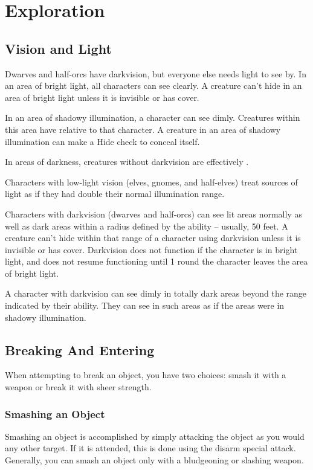 \section{Exploration}
\subsection{Vision and Light}
Dwarves and half-orcs have darkvision, but everyone else needs light to see by.  In an area of bright light, all characters can see clearly. A creature can't hide in an area of bright light unless it is invisible or has cover.

In an area of shadowy illumination, a character can see dimly. Creatures within this area have \concealment relative to that character. A creature in an area of shadowy illumination can make a Hide check to conceal itself.

In areas of darkness, creatures without darkvision are effectively \blinded.

Characters with low-light vision (elves, gnomes, and half-elves) treat sources of light as if they had double their normal illumination range.

Characters with darkvision (dwarves and half-orcs) can see lit areas normally as well as dark areas within a radius defined by the ability -- usually, 50 feet. A creature can't hide within that range of a character using darkvision unless it is invisible or has cover. Darkvision does not function if the character is in bright light, and does not resume functioning until 1 round the character leaves the area of bright light.

A character with darkvision can see dimly in totally dark areas beyond the range indicated by their ability. They can see in such areas as if the areas were in shadowy illumination.

\subsection{Breaking And Entering}
When attempting to break an object, you have two choices: smash it with a weapon or break it with sheer strength.

\subsubsection{Smashing an Object}
Smashing an object is accomplished by simply attacking the object as you would any other target. If it is attended, this is done using the disarm special attack. Generally, you can smash an object only with a bludgeoning or slashing weapon.

